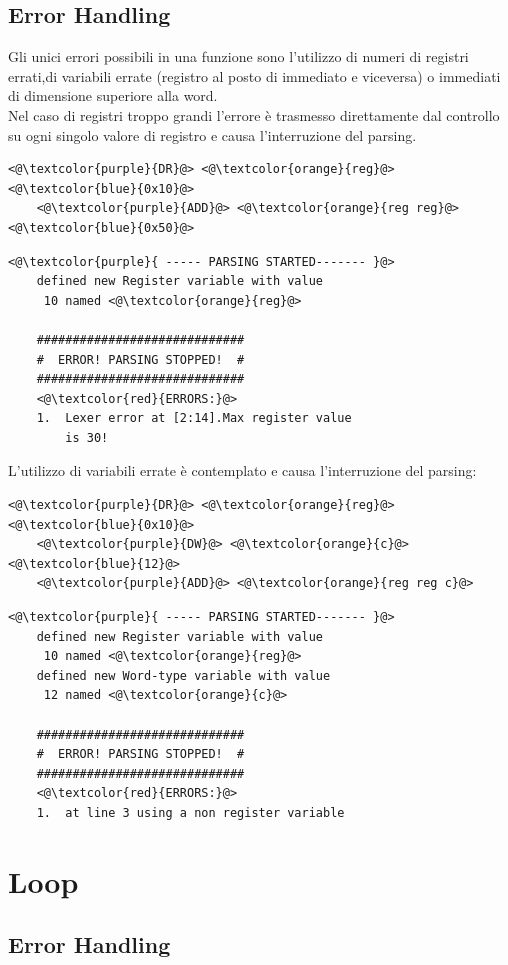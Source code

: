 \subsection{Error Handling}
Gli unici errori possibili in una funzione sono l'utilizzo di numeri di registri errati,di variabili errate (registro al posto di immediato e viceversa) o immediati di dimensione superiore alla word.
\\Nel caso di registri troppo grandi l'errore è trasmesso direttamente dal controllo su ogni singolo valore di registro e causa l'interruzione del parsing.
\begin{lstlisting}[caption=input]
    <@\textcolor{purple}{DR}@> <@\textcolor{orange}{reg}@> <@\textcolor{blue}{0x10}@>
    <@\textcolor{purple}{ADD}@> <@\textcolor{orange}{reg reg}@> <@\textcolor{blue}{0x50}@> 
\end{lstlisting}

\begin{lstlisting}[caption=output]
    <@\textcolor{purple}{ ----- PARSING STARTED------- }@>
    defined new Register variable with value 
     10 named <@\textcolor{orange}{reg}@> 

    #############################
    #  ERROR! PARSING STOPPED!  #
    #############################
    <@\textcolor{red}{ERRORS:}@>
    1.	Lexer error at [2:14].Max register value 
        is 30!
\end{lstlisting}
\newpage
L'utilizzo di variabili errate è contemplato e causa l'interruzione del parsing:
\begin{lstlisting}[caption=input]
    <@\textcolor{purple}{DR}@> <@\textcolor{orange}{reg}@> <@\textcolor{blue}{0x10}@>
    <@\textcolor{purple}{DW}@> <@\textcolor{orange}{c}@> <@\textcolor{blue}{12}@>
    <@\textcolor{purple}{ADD}@> <@\textcolor{orange}{reg reg c}@> 
\end{lstlisting}
\begin{lstlisting}[caption=output]
    <@\textcolor{purple}{ ----- PARSING STARTED------- }@>
    defined new Register variable with value 
     10 named <@\textcolor{orange}{reg}@> 
    defined new Word-type variable with value 
     12 named <@\textcolor{orange}{c}@>
    
    #############################
    #  ERROR! PARSING STOPPED!  #
    #############################
    <@\textcolor{red}{ERRORS:}@>
    1.	at line 3 using a non register variable
\end{lstlisting}


\section{Loop}


\subsection{Error Handling}



